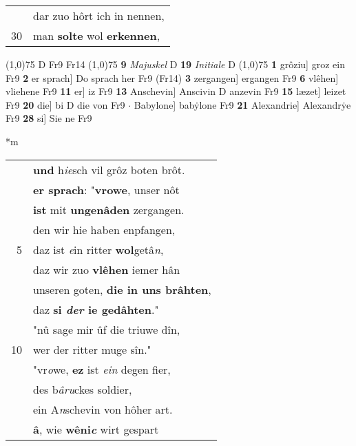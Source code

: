 \documentclass[8pt,a4paper,notitlepage]{article}
\begin{document}
\begin{table}[ht]
\begin{minipage}[t]{0.5\linewidth}
\begin{tabular}{rl}
 & dar zuo hôrt ich in nennen,\\ 
30 & man \textbf{solte} wol \textbf{erkennen},\\ 
\end{tabular}
\scriptsize
\line(1,0){75} \newline
D Fr9 Fr14 \newline
\line(1,0){75} \newline
\textbf{9} \textit{Majuskel} D  \textbf{19} \textit{Initiale} D  \newline
\line(1,0){75} \newline
\textbf{1} grôziu] groz ein Fr9 \textbf{2} er sprach] Do sprach her Fr9 (Fr14) \textbf{3} zergangen] ergangen Fr9 \textbf{6} vlêhen] vliehene Fr9 \textbf{11} er] iz Fr9 \textbf{13} Anschevin] Anscivin D anzevin Fr9 \textbf{15} læzet] leizet Fr9 \textbf{20} die] bi D die von Fr9  $\cdot$ Babylone] babẏlone Fr9 \textbf{21} Alexandrie] Alexandrẏe Fr9 \textbf{28} si] Sie ne Fr9 \newline
\end{minipage}
\hspace{0.5cm}
\begin{minipage}[t]{0.5\linewidth}
\small
\begin{center}*m
\end{center}
\begin{tabular}{rl}
 & \textbf{und} h\textit{ie}sch vil grôz boten brôt.\\ 
 & \textbf{er sprach}: "\textbf{vrowe}, unser nôt\\ 
 & \textbf{ist} mit \textbf{ungenâden} zergangen.\\ 
 & den wir hie haben enpfangen,\\ 
5 & daz ist \textit{e}in ritter \textbf{wol}getâ\textit{n},\\ 
 & daz wir zuo \textbf{vlêhen} iemer hân\\ 
 & unseren goten, \textbf{die in uns brâhten},\\ 
 & daz \textbf{si \textit{der} ie gedâhten}."\\ 
 & "nû sage mir ûf die triuwe dîn,\\ 
10 & wer der ritter muge sîn."\\ 
 & "vr\textit{o}we, \textbf{ez} ist \textit{ein} degen fier,\\ 
 & des b\textit{âru}ckes soldier,\\ 
 & ein A\textit{n}schevin von hôher art.\\ 
 & \textbf{â}, wie \textbf{wêni\textit{c}} wirt gespart\\ 

\end{tabular}
\end{minipage}
\end{table}
\end{document}
